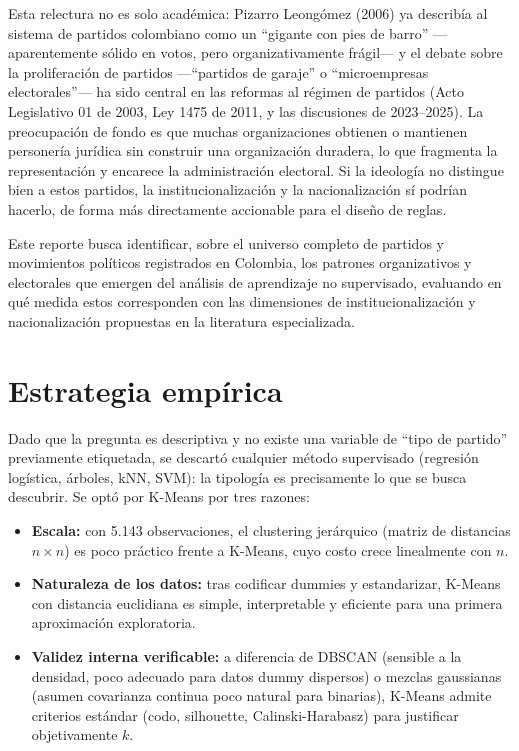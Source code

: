 \documentclass[11pt,letterpaper]{article}
\begin{document}
Esta relectura no es solo académica: Pizarro Leongómez (2006) ya describía al sistema de partidos colombiano como un ``gigante con pies de barro'' ---aparentemente sólido en votos, pero organizativamente frágil--- y el debate sobre la proliferación de partidos ---``partidos de garaje'' o ``microempresas electorales''--- ha sido central en las reformas al régimen de partidos (Acto Legislativo 01 de 2003, Ley 1475 de 2011, y las discusiones de 2023--2025). La preocupación de fondo es que muchas organizaciones obtienen o mantienen personería jurídica sin construir una organización duradera, lo que fragmenta la representación y encarece la administración electoral. Si la ideología no distingue bien a estos partidos, la institucionalización y la nacionalización sí podrían hacerlo, de forma más directamente accionable para el diseño de reglas.

Este reporte busca identificar, sobre el universo completo de partidos y movimientos políticos registrados en Colombia, los patrones organizativos y electorales que emergen del análisis de aprendizaje no supervisado, evaluando en qué medida estos corresponden con las dimensiones de institucionalización y nacionalización propuestas en la literatura especializada.

\section{Estrategia empírica}

Dado que la pregunta es descriptiva y no existe una variable de ``tipo de partido'' previamente etiquetada, se descartó cualquier método supervisado (regresión logística, árboles, kNN, SVM): la tipología es precisamente lo que se busca descubrir. Se optó por K-Means por tres razones:

\begin{itemize}[topsep=0.3em,itemsep=0.2em]
  \item \textbf{Escala:} con 5.143 observaciones, el clustering jerárquico (matriz de distancias $n\times n$) es poco práctico frente a K-Means, cuyo costo crece linealmente con $n$.
  \item \textbf{Naturaleza de los datos:} tras codificar dummies y estandarizar, K-Means con distancia euclidiana es simple, interpretable y eficiente para una primera aproximación exploratoria.
  \item \textbf{Validez interna verificable:} a diferencia de DBSCAN (sensible a la densidad, poco adecuado para datos dummy dispersos) o mezclas gaussianas (asumen covarianza continua poco natural para binarias), K-Means admite criterios estándar (codo, silhouette, Calinski-Harabasz) para justificar objetivamente $k$.
\end{itemize}
\end{document}
